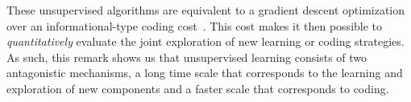 \documentclass[a4paper, 11pt, draft]{article} %
\begin{document}
These unsupervised algorithms are equivalent to a gradient descent optimization over an informational-type coding cost~\citep{Kingma13}. This cost makes it then possible to \emph{quantitatively} evaluate the joint exploration of new learning or coding strategies.
As such, this remark shows us that unsupervised learning consists of two antagonistic mechanisms, a long time scale that corresponds to the learning and exploration of new components and a faster scale that corresponds to coding.
\end{document}
